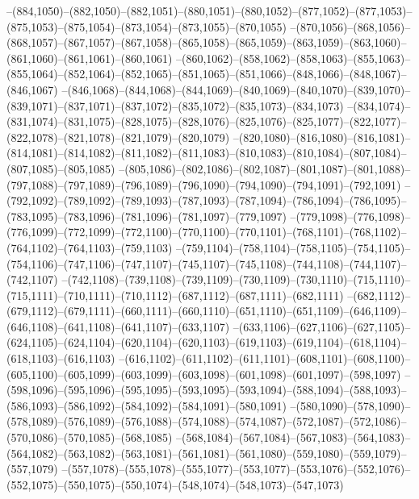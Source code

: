 --(884,1050)--(882,1050)--(882,1051)--(880,1051)--(880,1052)--(877,1052)--(877,1053)--(875,1053)--(875,1054)--(873,1054)--(873,1055)--(870,1055)
--(870,1056)--(868,1056)--(868,1057)--(867,1057)--(867,1058)--(865,1058)--(865,1059)--(863,1059)--(863,1060)--(861,1060)--(861,1061)--(860,1061)
--(860,1062)--(858,1062)--(858,1063)--(855,1063)--(855,1064)--(852,1064)--(852,1065)--(851,1065)--(851,1066)--(848,1066)--(848,1067)--(846,1067)
--(846,1068)--(844,1068)--(844,1069)--(840,1069)--(840,1070)--(839,1070)--(839,1071)--(837,1071)--(837,1072)--(835,1072)--(835,1073)--(834,1073)
--(834,1074)--(831,1074)--(831,1075)--(828,1075)--(828,1076)--(825,1076)--(825,1077)--(822,1077)--(822,1078)--(821,1078)--(821,1079)--(820,1079)
--(820,1080)--(816,1080)--(816,1081)--(814,1081)--(814,1082)--(811,1082)--(811,1083)--(810,1083)--(810,1084)--(807,1084)--(807,1085)--(805,1085)
--(805,1086)--(802,1086)--(802,1087)--(801,1087)--(801,1088)--(797,1088)--(797,1089)--(796,1089)--(796,1090)--(794,1090)--(794,1091)--(792,1091)
--(792,1092)--(789,1092)--(789,1093)--(787,1093)--(787,1094)--(786,1094)--(786,1095)--(783,1095)--(783,1096)--(781,1096)--(781,1097)--(779,1097)
--(779,1098)--(776,1098)--(776,1099)--(772,1099)--(772,1100)--(770,1100)--(770,1101)--(768,1101)--(768,1102)--(764,1102)--(764,1103)--(759,1103)
--(759,1104)--(758,1104)--(758,1105)--(754,1105)--(754,1106)--(747,1106)--(747,1107)--(745,1107)--(745,1108)--(744,1108)--(744,1107)--(742,1107)
--(742,1108)--(739,1108)--(739,1109)--(730,1109)--(730,1110)--(715,1110)--(715,1111)--(710,1111)--(710,1112)--(687,1112)--(687,1111)--(682,1111)
--(682,1112)--(679,1112)--(679,1111)--(660,1111)--(660,1110)--(651,1110)--(651,1109)--(646,1109)--(646,1108)--(641,1108)--(641,1107)--(633,1107)
--(633,1106)--(627,1106)--(627,1105)--(624,1105)--(624,1104)--(620,1104)--(620,1103)--(619,1103)--(619,1104)--(618,1104)--(618,1103)--(616,1103)
--(616,1102)--(611,1102)--(611,1101)--(608,1101)--(608,1100)--(605,1100)--(605,1099)--(603,1099)--(603,1098)--(601,1098)--(601,1097)--(598,1097)
--(598,1096)--(595,1096)--(595,1095)--(593,1095)--(593,1094)--(588,1094)--(588,1093)--(586,1093)--(586,1092)--(584,1092)--(584,1091)--(580,1091)
--(580,1090)--(578,1090)--(578,1089)--(576,1089)--(576,1088)--(574,1088)--(574,1087)--(572,1087)--(572,1086)--(570,1086)--(570,1085)--(568,1085)
--(568,1084)--(567,1084)--(567,1083)--(564,1083)--(564,1082)--(563,1082)--(563,1081)--(561,1081)--(561,1080)--(559,1080)--(559,1079)--(557,1079)
--(557,1078)--(555,1078)--(555,1077)--(553,1077)--(553,1076)--(552,1076)--(552,1075)--(550,1075)--(550,1074)--(548,1074)--(548,1073)--(547,1073)
